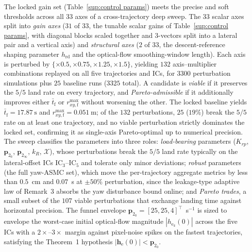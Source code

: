 \documentclass{IEEEtaes}
\begin{document}
The locked gain set (Table~\ref{sup:control params}) meets the precise and soft thresholds across all 33 axes of a cross-trajectory deep sweep. The $33$ scalar axes split into \emph{gain axes} ($31$ of $33$, the tunable scalar gains of Table~\ref{sup:control params}, with diagonal blocks scaled together and 3-vectors split into a lateral pair and a vertical axis) and \emph{structural axes} ($2$ of $33$, the descent-reference shaping parameter $h_\text{rd}$ and the optical-flow smoothing-window length). Each axis is perturbed by $\{\times 0.5,\times 0.75,\times 1.25,\times 1.5\}$, yielding $132$ axis--multiplier combinations replayed on all five trajectories and ICs, for $3300$ perturbation simulations plus $25$ baseline runs ($3325$ total). A candidate is \emph{viable} if it preserves the $5/5$ land rate on every trajectory, and \emph{Pareto-admissible} if it additionally improves either $\bar{t}_\text{f}$ or $r_{xy,\text{f}}^{\max}$ without worsening the other. The locked baseline yields $\bar{t}_\text{f}=17.87~\text{s}$ and $r_{xy,\text{f}}^{\max}=0.051~\text{m}$; of the $132$ perturbations, $25$ ($19\%$) break the $5/5$ rate on at least one trajectory, and no viable perturbation strictly dominates the locked set, confirming it as single-axis Pareto-optimal up to numerical precision. The sweep classifies the parameters into three roles: \emph{load-bearing} parameters ($K_{rp}$, $\boldsymbol{p}_{2_0}$, $\boldsymbol{p}_{2_\infty}$, $k_R$, $\mathcal{X}$), whose perturbations break the $5/5$ land rate typically on the lateral-offset ICs IC$_3$--IC$_5$ and tolerate only minor deviations; \emph{robust} parameters (the full yaw-ASMC set), which move the per-trajectory aggregate metrics by less than $0.5$~cm and $0.07$~s at $\pm 50\%$ perturbation, since the leakage-type adaptive law of Remark~3 absorbs the yaw disturbance bound online; and \emph{Pareto trades}, a small subset of the $107$ viable perturbations that exchange landing time against horizontal precision. The funnel envelope $\boldsymbol{p}_{2_0}=[25,25,4]^\top$~s$^{-1}$ is sized to envelope the worst-case initial optical-flow magnitude $|h_{\text{e}_k}(0)|$ across the five ICs with a $2\times$--$3\times$ margin against pixel-noise spikes on the fastest trajectories, satisfying the Theorem~1 hypothesis $|\boldsymbol{h}_\text{e}(0)|<\boldsymbol{p}_{2_0}$.
\end{document}
